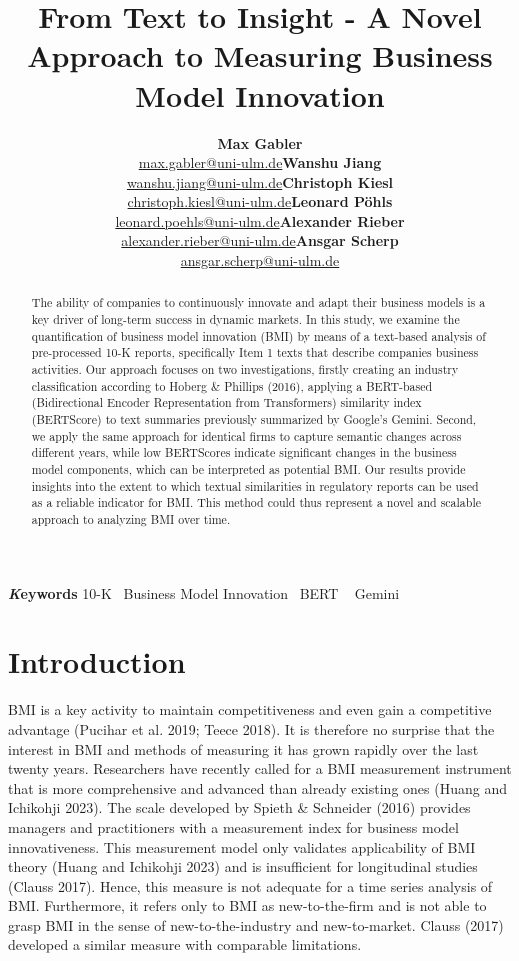 \documentclass[
]{article}
\title{From Text to Insight - A Novel Approach to Measuring Business
Model Innovation}
\author{\textbf{Max
Gabler}\\\href{mailto:max.gabler@uni-ulm.de}{max.gabler@uni-ulm.de}\asep\textbf{Wanshu
Jiang}\\\href{mailto:wanshu.jiang@uni-ulm.de}{wanshu.jiang@uni-ulm.de}\asep\textbf{Christoph
Kiesl}\\\href{mailto:christoph.kiesl@uni-ulm.de}{christoph.kiesl@uni-ulm.de}\asep\textbf{Leonard
Pöhls}\\\href{mailto:leonard.poehls@uni-ulm.de}{leonard.poehls@uni-ulm.de}\asep\textbf{Alexander
Rieber}\\\href{mailto:alexander.rieber@uni-ulm.de}{alexander.rieber@uni-ulm.de}\asep\textbf{Ansgar
Scherp}\\\href{mailto:ansgar.scherp@uni-ulm.de}{ansgar.scherp@uni-ulm.de}}
\date{}
\begin{document}
\maketitle
\begin{abstract}
The ability of companies to continuously innovate and adapt their
business models is a key driver of long-term success in dynamic markets.
In this study, we examine the quantification of business model
innovation (BMI) by means of a text-based analysis of pre-processed 10-K
reports, specifically Item 1 texts that describe companies business
activities. Our approach focuses on two investigations, firstly creating
an industry classification according to Hoberg \& Phillips (2016),
applying a BERT-based (Bidirectional Encoder Representation from
Transformers) similarity index (BERTScore) to text summaries previously
summarized by Google's Gemini. Second, we apply the same approach for
identical firms to capture semantic changes across different years,
while low BERTScores indicate significant changes in the business model
components, which can be interpreted as potential BMI. Our results
provide insights into the extent to which textual similarities in
regulatory reports can be used as a reliable indicator for BMI. This
method could thus represent a novel and scalable approach to analyzing
BMI over time.
\end{abstract}
{\bfseries \emph Keywords}
\def\sep{\textbullet\ }
10-K \sep Business Model Innovation \sep BERT \sep 
Gemini


\newpage{}

\section{Introduction}\label{introduction}

BMI is a key activity to maintain competitiveness and even gain a
competitive advantage (Pucihar et al. 2019; Teece 2018). It is therefore
no surprise that the interest in BMI and methods of measuring it has
grown rapidly over the last twenty years. Researchers have recently
called for a BMI measurement instrument that is more comprehensive and
advanced than already existing ones (Huang and Ichikohji 2023). The
scale developed by Spieth \& Schneider (2016) provides managers and
practitioners with a measurement index for business model
innovativeness. This measurement model only validates applicability of
BMI theory (Huang and Ichikohji 2023) and is insufficient for
longitudinal studies (Clauss 2017). Hence, this measure is not adequate
for a time series analysis of BMI. Furthermore, it refers only to BMI as
new-to-the-firm and is not able to grasp BMI in the sense of
new-to-the-industry and new-to-market. Clauss (2017) developed a similar
measure with comparable limitations.
\end{document}

